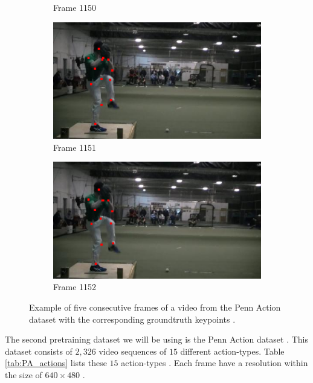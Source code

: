 \documentclass[./main.tex]{subfiles}
\begin{document}
\begin{figure}[htbp]
\begin{subfigure}{0.45\textwidth}
        \caption{Frame 1150}
    \end{subfigure}
    \begin{subfigure}{0.45\textwidth}
        \centering
        \includegraphics[width=\textwidth]{entities/PA_63.png}
        \caption{Frame 1151}
    \end{subfigure}
    \begin{subfigure}{0.45\textwidth}
        \centering
        \includegraphics[width=\textwidth]{entities/PA_64.png}
        \caption{Frame 1152}
    \end{subfigure}
    \caption{Example of five consecutive frames of a video from the Penn Action dataset with the corresponding groundtruth keypoints \cite{penn_action}.}
    \label{fig:PA_dataset}
\end{figure}
The second pretraining dataset we will be using is the Penn Action dataset \cite{penn_action}. This dataset consists of $2,326$ video sequences of $15$ different action-types. Table \ref{tab:PA_actions} lists these $15$ action-types \cite{penn_action}. Each frame have a resolution within the size of $640 \times 480$ \cite{penn_action}.
\\
\end{document}

